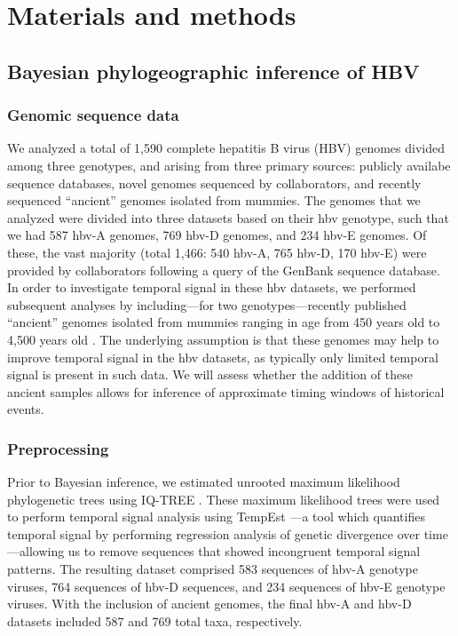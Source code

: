 \chapter{Materials and methods}
\label{ch:methodology}

\section{Bayesian phylogeographic inference of HBV}

\subsection{Genomic sequence data}
We analyzed a total of 1,590 complete hepatitis B virus (HBV) genomes divided among three genotypes, and arising from three primary sources: publicly availabe sequence databases, novel genomes sequenced by collaborators, and recently sequenced ``ancient'' genomes isolated from mummies.
The genomes that we analyzed were divided into three datasets based on their \gls{hbv} genotype, such that we had 587 \gls{hbv}-A genomes, 769 \gls{hbv}-D genomes, and 234 \gls{hbv}-E genomes.
Of these, the vast majority (total 1,466: 540 \gls{hbv}-A, 765 \gls{hbv}-D, 170 \gls{hbv}-E) were provided by collaborators following a query of the GenBank sequence database. %
In order to investigate temporal signal in these \gls{hbv} datasets, we performed subsequent analyses by including---for two genotypes---recently published ``ancient'' genomes isolated from mummies ranging in age from 450 years old to 4,500 years old \cite{muhlemann2018ancient, ross2018paradox}.
The underlying assumption is that these genomes may help to improve temporal signal in the \gls{hbv} datasets, as typically only limited temporal signal is present in such data.
We will assess whether the addition of these ancient samples allows for inference of approximate timing windows of historical events.

\subsection{Preprocessing}

Prior to Bayesian inference, we estimated unrooted maximum likelihood phylogenetic trees using IQ-TREE \cite{nguyen2015iq}. %
These maximum likelihood trees were used to perform temporal signal analysis using TempEst \cite{rambaut2016exploring}---a tool which quantifies temporal signal by performing regression analysis of genetic divergence over time---allowing us to remove sequences that showed incongruent temporal signal patterns.
The resulting dataset comprised 583 sequences of \gls{hbv}-A genotype viruses, 764 sequences of \gls{hbv}-D sequences, and 234 sequences of \gls{hbv}-E genotype viruses.
With the inclusion of ancient genomes, the final \gls{hbv}-A and \gls{hbv}-D datasets included 587 and 769 total taxa, respectively.

